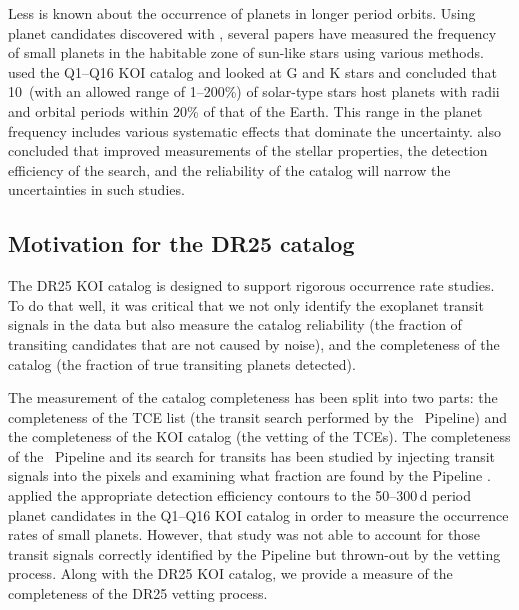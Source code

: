 Less is known about the occurrence of planets in longer period orbits. Using planet candidates discovered with \Kepler{}, several papers have measured the frequency of small planets in the habitable zone of sun-like stars \citep[see e.g.][]{Burke2015,ForemanMackey16,Petigura2013b} using various methods. \citet{Burke2015} used the Q1--Q16  KOI catalog \citep{Mullally2015cat} and looked at G and K stars and concluded that 10\ (with an allowed range of 1--200\%) of solar-type stars host planets with radii and orbital periods within 20\% of that of the Earth. This range in the planet frequency includes various systematic effects that dominate the uncertainty. \citet{Burke2015} also concluded that improved measurements of the stellar properties, the detection efficiency of the search, and the reliability of the catalog will narrow the uncertainties in such studies. 


\subsection{Motivation for the DR25 catalog}

The DR25 KOI catalog is designed to support rigorous occurrence rate studies. To do that well, it was critical that we not only identify the exoplanet transit signals in the data but also measure the catalog reliability (the fraction of transiting candidates that are not caused by noise), and the completeness of the catalog (the fraction of true transiting planets detected).

The measurement of the catalog completeness has been split into two parts: the completeness of the TCE list (the transit search performed by the \Kepler\ Pipeline) and the completeness of the KOI catalog (the vetting of the TCEs). The completeness of the \Kepler\ Pipeline and its search for transits has been studied by injecting transit signals into the pixels and examining what fraction are found by the \Kepler{} Pipeline \citep{Christiansen2017, Christiansen2015b,Christiansen2013a}. \citet{Burke2015} applied the appropriate detection efficiency contours \citep{Christiansen2015} to the 50--300\,d period planet candidates in the Q1--Q16 KOI catalog \citep{Mullally2015cat} in order to measure the occurrence rates of small planets. However, that study was not able to account for those transit signals correctly identified by the \Kepler{} Pipeline but thrown-out by the vetting process. Along with the DR25 KOI catalog, we provide a measure of the completeness of the DR25 vetting process. 

